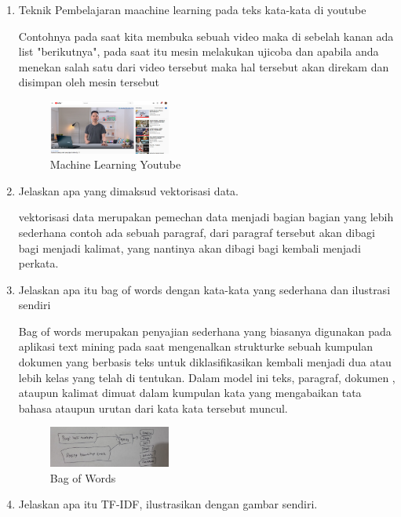 \begin{enumerate}
        \item Teknik Pembelajaran maachine learning pada teks kata-kata di youtube
        
        Contohnya pada saat kita membuka sebuah video maka di sebelah kanan ada list "berikutnya", pada saat itu mesin melakukan ujicoba dan apabila anda menekan salah satu dari video tersebut maka hal tersebut akan direkam dan disimpan oleh mesin tersebut

        \begin{figure}[H]
            \includegraphics[width=4cm]{figures/1174040/chapter4/youtube.png}
            \centering
            \caption{Machine Learning Youtube}
        \end{figure}

        \item Jelaskan apa yang dimaksud vektorisasi data.
        
        vektorisasi data merupakan pemechan data menjadi bagian bagian yang lebih sederhana contoh ada sebuah paragraf, dari paragraf tersebut akan dibagi bagi menjadi kalimat, yang nantinya akan dibagi bagi kembali menjadi perkata.

        \item Jelaskan apa itu bag of words dengan kata-kata yang sederhana dan ilustrasi sendiri
        
        Bag of words merupakan penyajian sederhana yang biasanya digunakan pada aplikasi text mining pada saat mengenalkan strukturke sebuah kumpulan dokumen yang berbasis teks untuk diklasifikasikan kembali menjadi dua atau lebih kelas yang telah di tentukan.
        Dalam model ini teks, paragraf, dokumen , ataupun kalimat dimuat dalam kumpulan kata yang mengabaikan tata bahasa ataupun urutan dari kata kata tersebut muncul.
        \begin{figure}[H]
            \includegraphics[width=4cm]{figures/1174040/chapter4/box.jpeg}
            \centering
            \caption{Bag of Words}
        \end{figure}

        \item Jelaskan apa itu TF-IDF, ilustrasikan dengan gambar sendiri.
        

\end{enumerate}
